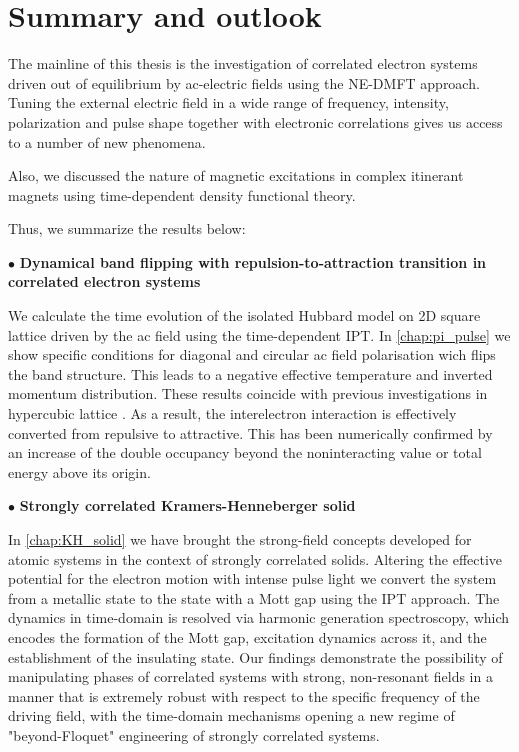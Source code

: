 \chapter{Summary and outlook}
The mainline of this thesis is the investigation of correlated electron systems driven out of equilibrium by ac-electric fields using the NE-DMFT approach. Tuning the external electric field in a wide range of frequency, intensity, polarization and pulse shape together with electronic correlations gives us access to a number of new phenomena. 

Also, we discussed the nature of magnetic excitations in complex itinerant magnets using time-dependent density functional theory.

Thus, we summarize the results below:

\vspace*{0.2cm}
$\bullet$ \textbf{Dynamical band flipping with repulsion-to-attraction\: transition in correlated electron systems}

We calculate the time evolution of the isolated Hubbard model on 2D square lattice driven by the ac field using the time-dependent IPT. 
In \autoref{chap:pi_pulse} we show specific conditions for diagonal and circular ac field polarisation wich flips the band structure. This leads to a negative effective temperature and inverted momentum distribution. These results coincide with previous investigations in hypercubic lattice \citep{PhysRevB.85.155124}. 
As a result, the interelectron interaction is effectively converted from repulsive to attractive. This has been numerically confirmed by an increase of the double occupancy beyond the noninteracting value or total energy above its origin.


\vspace*{0.2cm}
$\bullet$ \textbf{Strongly correlated Kramers-Henneberger solid}

In \autoref{chap:KH_solid} we have brought the strong-field concepts developed for atomic systems in the context of strongly correlated
solids. Altering the effective potential for the electron motion with intense pulse light we convert the system from a metallic state to the state
with a Mott gap using the IPT approach. The dynamics in time-domain is resolved via harmonic generation spectroscopy, which encodes the formation of the Mott gap, 
excitation dynamics across it, and the establishment of the insulating state. 
Our findings demonstrate the possibility of manipulating phases 
of correlated systems with strong, non-resonant  
fields in a manner that is extremely robust with respect to the specific
frequency of the driving field, with the time-domain mechanisms opening a new regime of "beyond-Floquet" engineering of strongly correlated systems.

